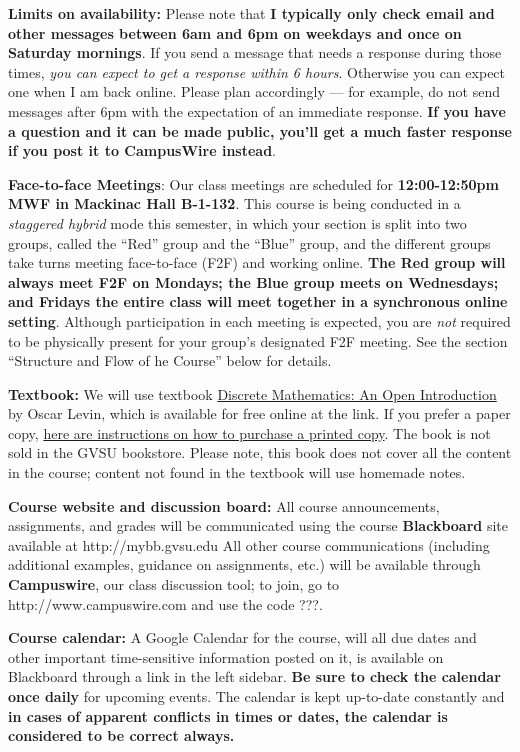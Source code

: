 \documentclass[]{article}
\begin{document}
\textbf{Limits on availability:} Please note that \textbf{I typically
only check email and other messages between 6am and 6pm on weekdays and
once on Saturday mornings}. If you send a message that needs a response
during those times, \emph{you can expect to get a response within 6
hours}. Otherwise you can expect one when I am back online. Please plan
accordingly --- for example, do not send messages after 6pm with the
expectation of an immediate response. \textbf{If you have a question and
it can be made public, you'll get a much faster response if you post it
to CampusWire instead}.

\textbf{Face-to-face Meetings}: Our class meetings are scheduled for
\textbf{12:00-12:50pm MWF in Mackinac Hall B-1-132}. This course is
being conducted in a \emph{staggered hybrid} mode this semester, in
which your section is split into two groups, called the ``Red'' group
and the ``Blue'' group, and the different groups take turns meeting
face-to-face (F2F) and working online. \textbf{The Red group will always
meet F2F on Mondays; the Blue group meets on Wednesdays; and Fridays the
entire class will meet together in a synchronous online setting}.
Although participation in each meeting is expected, you are \emph{not}
required to be physically present for your group's designated F2F
meeting. See the section ``Structure and Flow of he Course'' below for
details.

\textbf{Textbook:} We will use textbook
\href{http://discretetext.oscarlevin.com/dmoi/}{Discrete Mathematics: An
Open Introduction} by Oscar Levin, which is available for free online at
the link. If you prefer a paper copy,
\href{http://discretetext.oscarlevin.com/download.php}{here are
instructions on how to purchase a printed copy}. The book is not sold in
the GVSU bookstore. Please note, this book does not cover all the
content in the course; content not found in the textbook will use
homemade notes.

\textbf{Course website and discussion board:} All course announcements,
assignments, and grades will be communicated using the course
\textbf{Blackboard} site available at http://mybb.gvsu.edu All other
course communications (including additional examples, guidance on
assignments, etc.) will be available through \textbf{Campuswire}, our
class discussion tool; to join, go to http://www.campuswire.com and use
the code ???.

\textbf{Course calendar:} A Google Calendar for the course, will all due
dates and other important time-sensitive information posted on it, is
available on Blackboard through a link in the left sidebar. \textbf{Be
sure to check the calendar once daily} for upcoming events. The calendar
is kept up-to-date constantly and \textbf{in cases of apparent conflicts
in times or dates, the calendar is considered to be correct always.}
\end{document}
